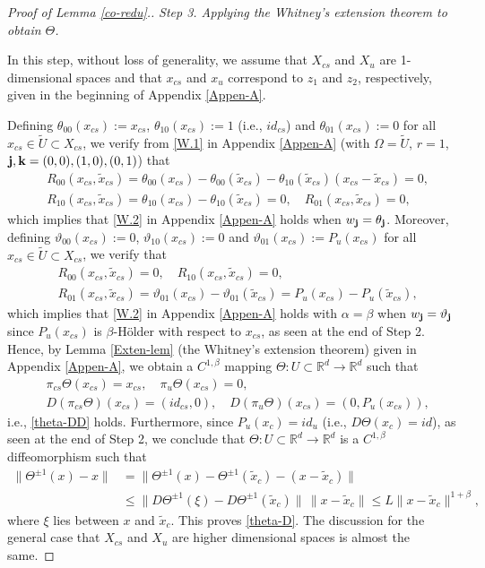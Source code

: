 \documentclass[reqno]{amsart}
\numberwithin{equation}{section}
\begin{document}
\begin{proof}[Proof of Lemma {\rm \ref{co-redu}}.]
{\em Step 3. Applying the Whitney's extension theorem to obtain $\Theta$.}

In this step, without loss of  generality, we assume that $X_{cs}$ and $X_u$ are 1-dimensional spaces and that $x_{cs}$ and $x_u$ correspond to $z_1$ and $z_2$, respectively, given in the beginning of Appendix \ref{Appen-A}.

Defining $\theta_{00}(x_{cs}):=x_{cs}$, $\theta_{10}(x_{cs}):=1$ (i.e., $id_{cs}$)
and $\theta_{01}(x_{cs}):=0$
for all $x_{cs}\in \tilde U\subset X_{cs}$, we verify from \eqref{W.1} in Appendix \ref{Appen-A} (with $\Omega=\tilde U$, $r=1$, ${\bf j}, {\bf k}=(0,0),(1,0),(0,1)$) that
\begin{align*}
&R_{00}(x_{cs},\tilde x_{cs})=\theta_{00}(x_{cs})-\theta_{00}(\tilde x_{cs})-\theta_{10}(\tilde x_{cs})(x_{cs}-\tilde x_{cs})=0,
\\
&R_{10}(x_{cs},\tilde x_{cs})=\theta_{10}(x_{cs})-\theta_{10}(\tilde x_{cs})=0,\quad
R_{01}(x_{cs},\tilde x_{cs})=0,
\end{align*}
which implies that  \eqref{W.2} in Appendix \ref{Appen-A} holds when $w_{\bf j}=\theta_{\bf j}$.
Moreover, defining $\vartheta_{00}(x_{cs}):=0$, $\vartheta_{10}(x_{cs}):=0$
and $\vartheta_{01}(x_{cs}):=P_u(x_{cs})$
for all $x_{cs}\in \tilde U\subset X_{cs}$, we verify that
\begin{align*}
&R_{00}(x_{cs},\tilde x_{cs})=0,\quad
R_{10}(x_{cs},\tilde x_{cs})=0,
\\
&R_{01}(x_{cs},\tilde x_{cs})=\vartheta_{01}(x_{cs})-\vartheta_{01}(\tilde x_{cs})=P_u(x_{cs})-P_u(\tilde x_{cs}),
\end{align*}
which implies that  \eqref{W.2} in Appendix \ref{Appen-A} holds with $\alpha=\beta$ when $w_{\bf j}=\vartheta_{\bf j}$ since $P_u(x_{cs})$ is $\beta$-H\"older with respect to $x_{cs}$, as seen at the end of Step 2. Hence, by Lemma \ref{Exten-lem} (the Whitney’s extension theorem) given in Appendix \ref{Appen-A}, we obtain a $C^{1,\beta}$ mapping $\Theta: U\subset \mathbb{R}^d\to \mathbb{R}^d$ such that
\begin{align*}
&\pi_{cs} \Theta(x_{cs})=x_{cs},
\quad
\pi_u \Theta(x_{cs})=0,
\\
& D(\pi_{cs} \Theta)(x_{cs})=(id_{cs},0),
\quad
D(\pi_u \Theta)(x_{cs})=(0, P_u(x_{cs})),
\end{align*}
i.e., \eqref{theta-DD} holds.
Furthermore, since $P_u(x_{c})=id_u$ (i.e., $D\Theta(x_c)=id$), as seen at the end of Step 2, we conclude that $\Theta: U\subset \mathbb{R}^d\to \mathbb{R}^d$ is a $C^{1,\beta}$ diffeomorphism such that
\begin{align*}
\|\Theta^{\pm 1}(x)-x\|&=\|\Theta^{\pm 1}(x)-\Theta^{\pm 1}(\tilde x_c)-(x-\tilde x_c)\|
\\
&\le \|D\Theta^{\pm 1}(\xi)-D\Theta^{\pm 1}(\tilde x_c)\|\,\|x-\tilde x_c\|\le L\|x-\tilde x_c\|^{1+\beta},
\end{align*}
where $\xi$ lies between $x$ and $\tilde x_c$. This proves \eqref{theta-D}. The discussion for the general case that $X_{cs}$ and $X_u$ are higher dimensional spaces is almost the same.


\end{proof}
\end{document}
